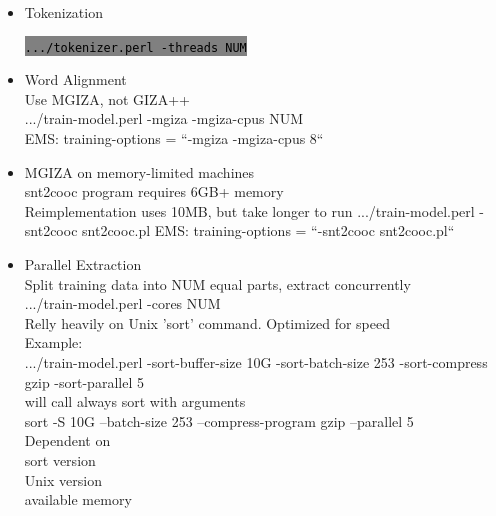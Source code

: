 \documentclass[landscape]{uedslides2C}
\newcommand{\littlecode}[1]{\colorbox{gray}{\textcolor{black}{\small \tt #1}}}
\begin{document}


\begin{itemize} \itemsep -1mm

\item {Tokenization}
  \begin{center}
    \littlecode{.../tokenizer.perl -threads NUM}
  \end{center}      
  
  
\end{itemize}
  


\begin{itemize} \itemsep -1mm

\item {Word Alignment}
  \\    Use MGIZA, not GIZA++
  \\    .../train-model.perl -mgiza -mgiza-cpus NUM
  \\    EMS: training-options = ``-mgiza -mgiza-cpus 8``
\item {MGIZA on memory-limited machines}
  \\ snt2cooc program requires 6GB+ memory
  \\ Reimplementation uses 10MB, but take longer to run
       .../train-model.perl -snt2cooc snt2cooc.pl
       EMS: training-options = ``-snt2cooc snt2cooc.pl``
       
\end{itemize}
       


\begin{itemize} \itemsep -1mm

\item {Parallel Extraction}
  \\ Split training data into NUM equal parts, extract concurrently
  \\ .../train-model.perl -cores NUM
  \\ Relly heavily on Unix 'sort' command. Optimized for speed
  \\ Example:
  \\     .../train-model.perl  -sort-buffer-size 10G -sort-batch-size 253 -sort-compress gzip -sort-parallel 5
  \\   will call always sort with arguments
  \\     sort  -S 10G --batch-size 253 --compress-program gzip --parallel 5
  \\ Dependent on
  \\      sort version
  \\      Unix version
  \\      available memory

\end{itemize}
\end{document}

